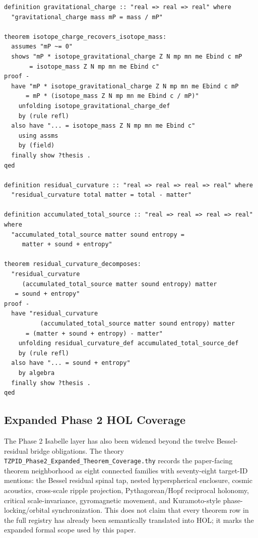 \documentclass[11pt,a4paper]{article}
\begin{document}
\begin{lstlisting}
definition gravitational_charge :: "real => real => real" where
  "gravitational_charge mass mP = mass / mP"

theorem isotope_charge_recovers_isotope_mass:
  assumes "mP ~= 0"
  shows "mP * isotope_gravitational_charge Z N mp mn me Ebind c mP
       = isotope_mass Z N mp mn me Ebind c"
proof -
  have "mP * isotope_gravitational_charge Z N mp mn me Ebind c mP
      = mP * (isotope_mass Z N mp mn me Ebind c / mP)"
    unfolding isotope_gravitational_charge_def
    by (rule refl)
  also have "... = isotope_mass Z N mp mn me Ebind c"
    using assms
    by (field)
  finally show ?thesis .
qed

definition residual_curvature :: "real => real => real => real" where
  "residual_curvature total matter = total - matter"

definition accumulated_total_source :: "real => real => real => real" where
  "accumulated_total_source matter sound entropy =
     matter + sound + entropy"

theorem residual_curvature_decomposes:
  "residual_curvature
     (accumulated_total_source matter sound entropy) matter
   = sound + entropy"
proof -
  have "residual_curvature
          (accumulated_total_source matter sound entropy) matter
      = (matter + sound + entropy) - matter"
    unfolding residual_curvature_def accumulated_total_source_def
    by (rule refl)
  also have "... = sound + entropy"
    by algebra
  finally show ?thesis .
qed
\end{lstlisting}

\subsection{Expanded Phase 2 HOL Coverage}

The Phase 2 Isabelle layer has also been widened beyond the twelve Bessel-residual bridge obligations. The theory \texttt{TZPID\_Phase2\_Expanded\_Theorem\_Coverage.thy} records the paper-facing theorem neighborhood as eight connected families with seventy-eight target-ID mentions: the Bessel residual spinal tap, nested hyperspherical enclosure, cosmic acoustics, cross-scale ripple projection, Pythagorean/Hopf reciprocal holonomy, critical scale-invariance, gyromagnetic movement, and Kuramoto-style phase-locking/orbital synchronization. This does not claim that every theorem row in the full registry has already been semantically translated into HOL; it marks the expanded formal scope used by this paper.
\end{document}
